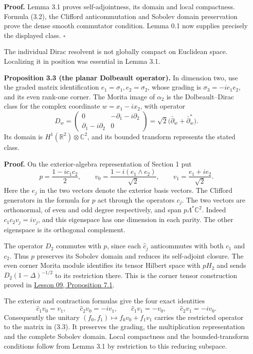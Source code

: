 \documentclass[
  11pt,
]{article}
\begin{document}
\textbf{Proof.} Lemma 3.1 proves self-adjointness, its domain and local
compactness. Formula (3.2), the Clifford anticommutation and Sobolev
domain preservation prove the dense smooth commutator condition. Lemma
0.1 now supplies precisely the displayed class. \(\square\)

The individual Dirac resolvent is not globally compact on Euclidean
space. Localizing it in position was essential in Lemma 3.1.

\textbf{Proposition 3.3 (the planar Dolbeault operator).} In dimension
two, use the graded matrix identification \(e_1=\sigma_1,e_2=\sigma_2\),
whose grading is \(\sigma_3=-ie_1e_2\), and its even rank-one corner.
The Morita image of \(\alpha_2\) is the Dolbeault--Dirac class for the
complex coordinate \(w=x_1-ix_2\), with operator \[
D_w=\begin{pmatrix}
0&-\partial_1-i\partial_2\\
\partial_1-i\partial_2&0
\end{pmatrix}
=\sqrt2\bigl(\bar\partial_w+\bar\partial_w^*\bigr).
\tag{3.3}
\] Its domain is \(H^1(\mathbb R^2)\otimes\mathbb C^2\), and its bounded
transform represents the stated class.

\textbf{Proof.} On the exterior-algebra representation of Section 1 put
\[
p=\frac{1-ic_1c_2}{2},\qquad
v_0=\frac{1-i(e_1\wedge e_2)}{\sqrt2},\qquad
v_1=\frac{e_1+ie_2}{\sqrt2}.
\tag{3.4}
\] Here the \(e_j\) in the two vectors denote the exterior basis
vectors. The Clifford generators in the formula for \(p\) act through
the operators \(c_j\). The two vectors are orthonormal, of even and odd
degree respectively, and span \(p\Lambda^*\mathbb C^2\). Indeed
\(c_1c_2v_j=iv_j\), and this eigenspace has one dimension in each
parity. The other eigenspace is its orthogonal complement.

The operator \(D_2\) commutes with \(p\), since each \(\widehat c_j\)
anticommutes with both \(c_1\) and \(c_2\). Thus \(p\) preserves its
Sobolev domain and reduces its self-adjoint closure. The even corner
Morita module identifies its tensor Hilbert space with \(pH_2\) and
sends \(D_2(1-\Delta)^{-1/2}\) to its restriction there. This is the
corner tensor construction proved in
\href{KT-KK-09.html\#7-morita-and-external-products}{Lesson 09,
Proposition 7.1}.

The exterior and contraction formulas give the four exact identities \[
\widehat c_1v_0=v_1,\qquad
\widehat c_2v_0=-iv_1,\qquad
\widehat c_1v_1=-v_0,\qquad
\widehat c_2v_1=-iv_0.
\tag{3.5}
\] Consequently the unitary \((f_0,f_1)\mapsto f_0v_0+f_1v_1\) carries
the restricted operator to the matrix in (3.3). It preserves the
grading, the multiplication representation and the complete Sobolev
domain. Local compactness and the bounded-transform conditions follow
from Lemma 3.1 by restriction to this reducing subspace.
\end{document}
